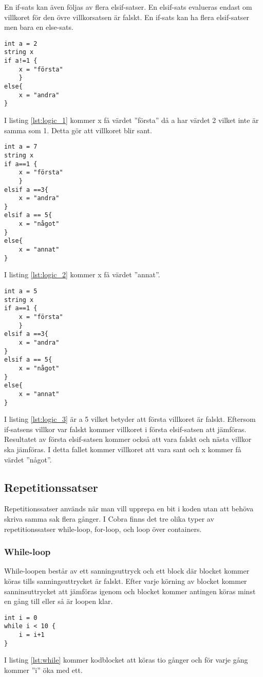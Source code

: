 \documentclass{TDP003mall}
\begin{document}
En if-sats kan även följas av flera elsif-satser. En elsif-sats evalueras endast om villkoret för den övre villkorsatsen är falskt.
En if-sats kan ha flera elsif-satser men bara en else-sats.

\begin{lstlisting}[caption=Villkorssatser-exempel, label=lst:logic_1]
int a = 2
string x
if a!=1 {
    x = "första"
    }
else{
    x = "andra"
}
\end{lstlisting}
I listing \ref{lst:logic_1} kommer x få värdet ''första'' då a har värdet 2 vilket inte är samma som 1. Detta gör att villkoret blir sant.
\begin{lstlisting}[caption=Villkorssatser-exempel 2, label=lst:logic_2]
int a = 7
string x
if a==1 {
    x = "första"
    }
elsif a ==3{
    x = "andra"
}
elsif a == 5{
    x = "något"
}
else{
    x = "annat"
}
\end{lstlisting}
I listing \ref{lst:logic_2} kommer x få värdet ''annat''.

\begin{lstlisting}[caption=Villkorssatser-exempel 3, label=lst:logic_3]
int a = 5
string x
if a==1 {
    x = "första"
    }
elsif a ==3{
    x = "andra"
}
elsif a == 5{
    x = "något"
}
else{
    x = "annat"
}
\end{lstlisting}
I listing \ref{lst:logic_3} är a 5 vilket betyder att första villkoret är falskt. 
Eftersom if-satsens villkor var falskt kommer villkoret i första elsif-satsen att jämföras.
Resultatet av första elsif-satsen kommer också att vara falskt och nästa villkor ska jämföras. 
I detta fallet kommer villkoret att vara sant och x kommer få värdet ''något''.

\subsection{Repetitionssatser}
Repetitionssatser används när man vill upprepa en bit i koden utan att behöva skriva samma sak flera gånger.
I Cobra finns det tre olika typer av repetitionssatser while-loop, for-loop, och loop över containers.

\subsubsection{While-loop}
While-loopen består av ett sanningsuttryck och ett block där blocket kommer köras tills sanningsuttrycket är falskt. 
Efter varje körning av blocket kommer sanninsuttrycket att jämföras igenom och blocket kommer antingen köras minst en gång till eller så är loopen klar.
\begin{lstlisting}[caption=While-loop-exempel, label=lst:while]
int i = 0
while i < 10 {
    i = i+1
}
\end{lstlisting}
I listing \ref{lst:while} kommer kodblocket att köras tio gånger och för varje gång kommer ''i'' öka med ett.
\end{document}
